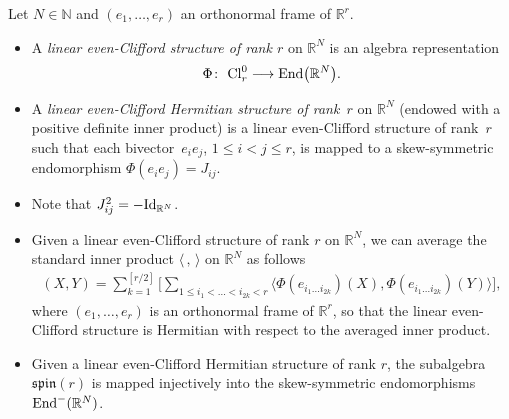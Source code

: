\documentclass[pdftex]{sigma}
\newcommand{\End}{{\rm End}}
\numberwithin{equation}{section}
\begin{document}
\begin{Definition} Let $N\in \mathbb{N}$ and $(e_1,\dots,e_r)$ an orthonormal frame of $\mathbb{R}^r$.
\begin{itemize}\itemsep=0pt
\item A {\em linear even-Clifford structure of rank $r$} on $\mathbb{R}^N$ is an algebra representation
\begin{gather*}\Phi\colon \ {\rm Cl}_r^0\longrightarrow \End\big(\mathbb{R}^N\big).\end{gather*}
\item A {\em linear even-Clifford Hermitian structure of rank~$r$} on $\mathbb{R}^N$ (endowed with a positive def\/inite inner product) is a linear even-Clif\/ford structure of rank~$r$ such that each bivec\-tor~$e_ie_j$, $1\leq i< j \leq r$, is mapped to a skew-symmetric endomorphism $\Phi(e_ie_j)=J_{ij}$.
\end{itemize}
\end{Definition}

\begin{Remark}\quad
\begin{itemize}\itemsep=0pt
\item Note that $J_{ij}^2=-{\rm Id}_{\mathbb{R}^N}$.
\item Given a linear even-Clif\/ford structure of rank $r$ on $\mathbb{R}^N$, we can average the standard inner product $\langle \,,\,\rangle $ on $\mathbb{R}^N$ as follows
\begin{gather*}(X,Y)=\sum_{k=1}^{[r/2]} \bigg[\sum_{1\leq i_1<\dots<i_{2k}<r}
\langle \Phi(e_{i_1\dots i_{2k}})(X),\Phi(e_{i_1\dots i_{2k}})(Y)\rangle \bigg], \end{gather*}
where $(e_1,\dots,e_r)$ is an orthonormal frame of $\mathbb{R}^r$, so that the linear even-Clif\/ford structure is Hermitian with respect to the averaged inner product.
\item Given a linear even-Clif\/ford Hermitian structure of rank $r$, the subalgebra~$\mathfrak{spin}(r)$ is mapped injectively into the skew-symmetric endomorphisms $\End^-(\mathbb{R}^N)$.
\end{itemize}
\end{Remark}
\end{document}
